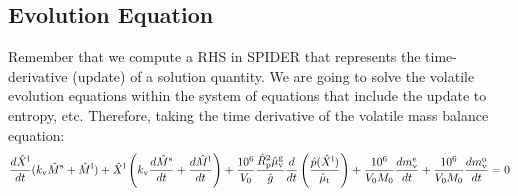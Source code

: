 \subsection{Evolution Equation}
Remember that we compute a RHS in SPIDER that represents the time-derivative (update) of a solution quantity.  We are going to solve the volatile evolution equations within the system of equations that include the update to entropy, etc.  Therefore, taking the time derivative of the volatile mass balance equation:
\begin{equation}
\frac{d \hat{X}^{\rm l}}{d t} (k_{\rm v} \hat{M}^{\rm s} + \hat{M}^{\rm l}) + \hat{X}^{\rm l} \left( k_{\rm v} \frac{d \hat{M}^{\rm s}}{d t} + \frac{d \hat{M}^{\rm l}}{d t} \right) + \frac{10^6}{V_0} \frac{\hat{R}_{\rm p}^2 \hat{\mu}_{\rm v}^{\rm g}}{\hat{g}} \frac{d}{dt} \left( \frac{\hat{p}(\hat{X}^{\rm l})}{\hat{\mu}_{\rm t}} \right) + \frac{10^6}{V_0 M_0} \frac{dm_{\rm v}^{\rm e}}{dt} + \frac{10^6}{V_0 M_0} \frac{dm_{\rm v}^{\rm o}}{dt} = 0
\end{equation}
